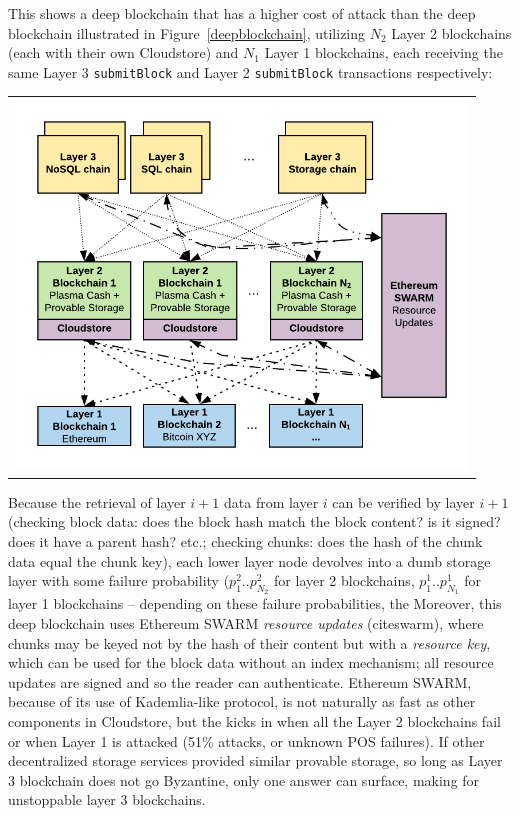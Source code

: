 \documentclass{article}
\begin{document}
This shows a deep blockchain that has a higher cost of attack than the deep blockchain illustrated in Figure~\ref{deepblockchain}, utilizing $N_2$ Layer 2 blockchains (each with their own Cloudstore) and $N_1$ Layer 1 blockchains, each receiving the same Layer 3 \texttt{submitBlock} and Layer 2 \texttt{submitBlock} transactions respectively:

\begin{tabular}{c}
\centerline{\includegraphics[width=12cm]{DeepBlockchain2.png}} \\
\end{tabular}

\noindent Because the retrieval of layer $i+1$ data from layer $i$ can be verified by layer $i+1$ (checking block data: does the block hash match the block content?  is it signed?  does it have a parent hash? etc.; checking chunks: does the hash of the chunk data equal the chunk key), each lower layer node devolves into a dumb storage layer with some failure probability ($p^2_{1}..p^2_{N_2}$ for layer 2 blockchains, $p_1^{1}..p^1_{N_1}$ for layer 1 blockchains -- depending on these failure probabilities, the
Moreover, this deep blockchain uses Ethereum SWARM {\em resource updates} (cite{swarm}), where chunks may be keyed not by the hash of their content but with a {\em resource key}, which can be used for the block data without an index mechanism; all resource updates are signed and so the reader can authenticate.  Ethereum SWARM, because of its use of Kademlia-like protocol, is not naturally as fast as other components in Cloudstore, but the kicks in when all the Layer 2 blockchains fail or when Layer 1 is attacked (51\% attacks, or unknown POS failures).   If other decentralized storage services provided similar provable storage, so long as Layer 3 blockchain does not go Byzantine, only one answer can surface, making for  unstoppable layer 3 blockchains.
\end{document}
